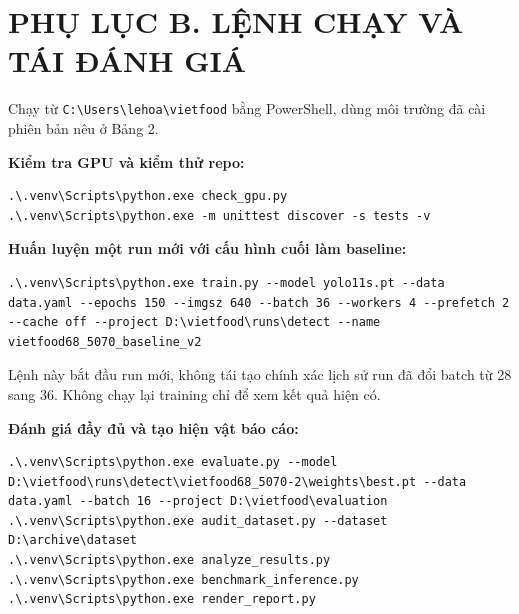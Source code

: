 \documentclass[
  vietnamese,
  12pt,
  a4paper,
]{article}
\begin{document}
\endgroup

\section{PHỤ LỤC B. LỆNH CHẠY VÀ TÁI ĐÁNH
GIÁ}\label{phux1ee5-lux1ee5c-b.-lux1ec7nh-chux1ea1y-vuxe0-tuxe1i-ux111uxe1nh-giuxe1}

Chạy từ
\texttt{C\allowbreak{}:\allowbreak{}\textbackslash{}\allowbreak{}U\allowbreak{}s\allowbreak{}e\allowbreak{}r\allowbreak{}s\allowbreak{}\textbackslash{}\allowbreak{}l\allowbreak{}e\allowbreak{}h\allowbreak{}o\allowbreak{}a\allowbreak{}\textbackslash{}\allowbreak{}v\allowbreak{}i\allowbreak{}e\allowbreak{}t\allowbreak{}f\allowbreak{}o\allowbreak{}o\allowbreak{}d\allowbreak{}}
bằng PowerShell, dùng môi trường đã cài phiên bản nêu ở Bảng 2.

\textbf{Kiểm tra GPU và kiểm thử repo:}

\begin{Verbatim}[breaklines=true,breakanywhere=true,fontsize=\footnotesize,baselinestretch=1]
.\.venv\Scripts\python.exe check_gpu.py
.\.venv\Scripts\python.exe -m unittest discover -s tests -v
\end{Verbatim}

\textbf{Huấn luyện một run mới với cấu hình cuối làm baseline:}

\begin{Verbatim}[breaklines=true,breakanywhere=true,fontsize=\footnotesize,baselinestretch=1]
.\.venv\Scripts\python.exe train.py --model yolo11s.pt --data data.yaml --epochs 150 --imgsz 640 --batch 36 --workers 4 --prefetch 2 --cache off --project D:\vietfood\runs\detect --name vietfood68_5070_baseline_v2
\end{Verbatim}

Lệnh này bắt đầu run mới, không tái tạo chính xác lịch sử run đã đổi
batch từ 28 sang 36. Không chạy lại training chỉ để xem kết quả hiện có.

\textbf{Đánh giá đầy đủ và tạo hiện vật báo cáo:}

\begin{Verbatim}[breaklines=true,breakanywhere=true,fontsize=\footnotesize,baselinestretch=1]
.\.venv\Scripts\python.exe evaluate.py --model D:\vietfood\runs\detect\vietfood68_5070-2\weights\best.pt --data data.yaml --batch 16 --project D:\vietfood\evaluation
.\.venv\Scripts\python.exe audit_dataset.py --dataset D:\archive\dataset
.\.venv\Scripts\python.exe analyze_results.py
.\.venv\Scripts\python.exe benchmark_inference.py
.\.venv\Scripts\python.exe render_report.py
\end{Verbatim}
\end{document}
